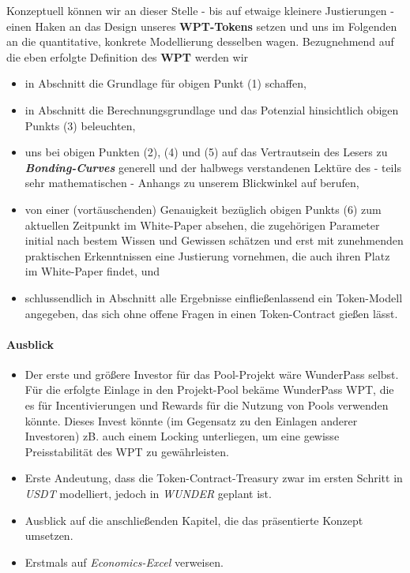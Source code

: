 \vspace{0.5cm}

Konzeptuell können wir an dieser Stelle - bis auf etwaige kleinere Justierungen - einen Haken an das Design unseres \textbf{WPT-Tokens} setzen und uns im Folgenden an die quantitative, konkrete Modellierung desselben wagen. Bezugnehmend auf die eben erfolgte Definition des \textbf{WPT} werden wir

\begin{itemize}
	\item in Abschnitt  die Grundlage für obigen Punkt (1) schaffen,
	\item in Abschnitt  die Berechnungsgrundlage und das Potenzial hinsichtlich obigen Punkts (3) beleuchten,
	\item uns bei obigen Punkten (2), (4) und (5) auf das Vertrautsein des Lesers zu \textbf{\textit{Bonding-Curves}} generell und der halbwegs verstandenen Lektüre des - teils sehr mathematischen - Anhangs zu unserem Blickwinkel auf  berufen,
	\item von einer (vortäuschenden) Genauigkeit bezüglich obigen Punkts (6) zum aktuellen Zeitpunkt im White-Paper absehen, die zugehörigen Parameter initial nach bestem Wissen und Gewissen schätzen und erst mit zunehmenden praktischen Erkenntnissen eine Justierung vornehmen, die auch ihren Platz im White-Paper findet, und
	\item schlussendlich in Abschnitt  alle Ergebnisse einfließenlassend ein Token-Modell angegeben, das sich ohne offene Fragen in einen Token-Contract gießen lässt. 
\end{itemize}

\vspace{0.5cm}


\paragraph{Ausblick}
\textbf{ }
\vspace{0.3cm}


\begin{itemize}
	\item Der erste und größere Investor für das Pool-Projekt wäre WunderPass selbst. Für die erfolgte Einlage in den Projekt-Pool bekäme WunderPass WPT, die es für Incentivierungen und Rewards für die Nutzung von Pools verwenden könnte. Dieses Invest könnte (im Gegensatz zu den Einlagen anderer Investoren) zB. auch einem Locking unterliegen, um eine gewisse Preisstabilität des WPT zu gewährleisten.	
	\item Erste Andeutung, dass die Token-Contract-Treasury zwar im ersten Schritt in \textit{USDT} modelliert, jedoch in \textit{WUNDER} geplant ist.
	\item Ausblick auf die anschließenden Kapitel, die das präsentierte Konzept umsetzen.
	\item Erstmals auf \textit{Economics-Excel} verweisen.
\end{itemize}
